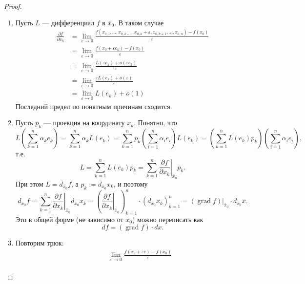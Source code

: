 \documentclass[12pt,a4paper]{article}
\DeclareMathOperator{\grad}{grad}
\begin{document}
    \begin{proof}
        \begin{enumerate}
            \item Пусть $L$ --- дифференциал $f$ в $\bar{x}_0$. В таком случае
                \begin{align*}
                    \frac{\partial f}{\partial x_k}
                    &= \lim_{\varepsilon \to 0} \frac{f(x_{0, 1}, \dots, x_{0, k-1}, x_{0, k} + \varepsilon, x_{0, k+1}, \dots, x_{0, n}) - f(x_0)}{\varepsilon}\\
                    &= \lim_{\varepsilon \to 0} \frac{f(x_0 + \varepsilon e_k) - f(x_0)}{\varepsilon}\\
                    &= \lim_{\varepsilon \to 0} \frac{L(\varepsilon e_k) + o(\varepsilon e_k)}{\varepsilon}\\
                    &= \lim_{\varepsilon \to 0} \frac{\varepsilon L(e_k) + o(\varepsilon)}{\varepsilon}\\
                    &= \lim_{\varepsilon \to 0} L(e_k) + o(1)
                \end{align*}
                Последний предел по понятным причинам сходится.
            \item Пусть $p_k$ --- проекция на координату $x_k$. Понятно, что
                \[
                    L\left(\sum_{k=1}^n \alpha_k e_k\right)
                    = \sum_{k=1}^n \alpha_k L(e_k)
                    = \sum_{k=1}^n p_k\left(\sum_{i=1}^n \alpha_i e_i\right) L(e_k)
                    = \left(\sum_{k=1}^n L(e_k) p_k\right)\left(\sum_{i=1}^n \alpha_i e_i\right),
                \]
                т.е.
                \[L = \sum_{k=1}^n L(e_k) p_k = \sum_{k=1}^n \left.\frac{\partial f}{\partial x_k}\right|_{\bar{x}_0} p_k.\]
                При этом $L = d_{\bar{x}_0}f$, а $p_k := d_{\bar{x}_0}x_k$, и поэтому
                \[
                    d_{x_0}f
                    = \sum_{k=1}^n \left.\frac{\partial f}{\partial x_k}\right|_{\bar{x}_0} d_{\bar{x}_0}x_k
                    = \left(\left.\frac{\partial f}{\partial x_k}\right|_{\bar{x}_0}\right)_{k=1}^n \cdot (d_{\bar{x}_0}x_k)_{k=1}^n
                    = \left.(\grad f)\right|_{\bar{x}_0} \cdot d_{\bar{x}_0}x.
                \]
                Это в общей форме (не зависимо от $\bar{x}_0$) можно переписать как
                \[df = (\grad f) \cdot dx.\]
            \item Повторим трюк:
                \begin{align*}
                    &\phantom{={}} \lim_{\varepsilon \to 0} \frac{f(x_0 + \varepsilon e) - f(x_0)}{\varepsilon}\\

\end{align*}
\end{enumerate}
\end{proof}
\end{document}
